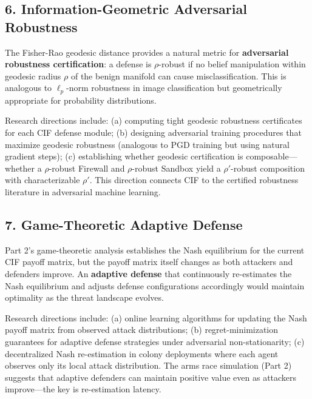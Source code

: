 \documentclass[
]{article}
\begin{document}
\subsection{6. Information-Geometric Adversarial
Robustness}\label{information-geometric-adversarial-robustness}

The Fisher-Rao geodesic distance \cite{amari2000methods} provides a
natural metric for \textbf{adversarial robustness certification}: a
defense is \(\rho\)-robust if no belief manipulation within geodesic
radius \(\rho\) of the benign manifold can cause misclassification. This
is analogous to \(\ell_p\)-norm robustness in image classification but
geometrically appropriate for probability distributions.

Research directions include: (a) computing tight geodesic robustness
certificates for each CIF defense module; (b) designing adversarial
training procedures that maximize geodesic robustness (analogous to PGD
training but using natural gradient steps); (c) establishing whether
geodesic certification is composable---whether a \(\rho\)-robust
Firewall and \(\rho\)-robust Sandbox yield a \(\rho'\)-robust
composition with characterizable \(\rho'\). This direction connects CIF
to the certified robustness literature in adversarial machine learning.

\subsection{7. Game-Theoretic Adaptive
Defense}\label{game-theoretic-adaptive-defense}

Part 2's game-theoretic analysis establishes the Nash equilibrium for
the current CIF payoff matrix, but the payoff matrix itself changes as
both attackers and defenders improve. An \textbf{adaptive defense} that
continuously re-estimates the Nash equilibrium and adjusts defense
configurations accordingly would maintain optimality as the threat
landscape evolves.

Research directions include: (a) online learning algorithms for updating
the Nash payoff matrix from observed attack distributions; (b)
regret-minimization guarantees for adaptive defense strategies under
adversarial non-stationarity; (c) decentralized Nash re-estimation in
colony deployments where each agent observes only its local attack
distribution. The arms race simulation (Part 2) suggests that adaptive
defenders can maintain positive value even as attackers improve---the
key is re-estimation latency.
\end{document}
